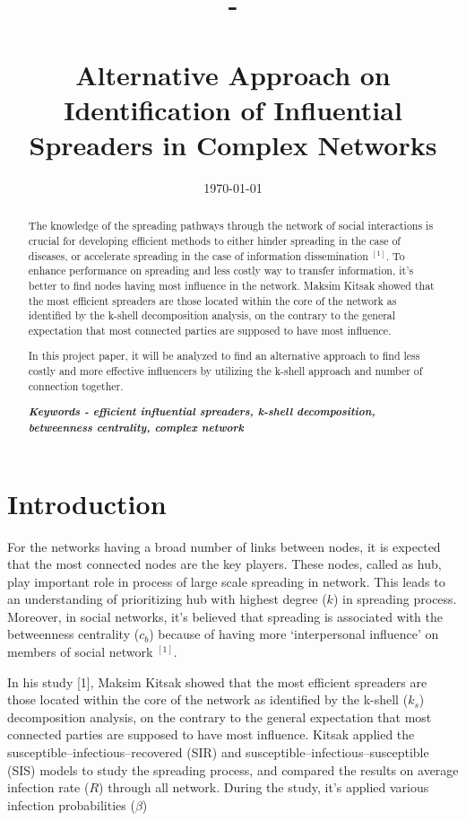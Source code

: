 \documentclass[11pt,a4,twocolumn]{article}
\title{
	{\small 	
		\hbCourse - 
		\hbSemester\\
	}
	\hbWhat\\
	Alternative Approach on Identification of Influential Spreaders in Complex Networks
}
\author{\hbYourName}
\date{\today}
\begin{document}
\maketitle

 \begin{abstract}

The knowledge of the spreading pathways through the network of social interactions is crucial for developing efficient methods to either hinder spreading in the case of diseases, or accelerate spreading in the case of information dissemination  $^{[1]}$. To enhance performance on spreading and less costly way to transfer information, it’s better to find nodes having most influence in the network.  Maksim Kitsak showed that the most efficient spreaders are those located within the core of the network as identified by the k-shell decomposition analysis, on the contrary to the general expectation that most connected parties are supposed to have most influence. 

In this project paper, it will be analyzed to find an alternative approach to find less costly and more effective influencers by utilizing the k-shell approach and number of connection together.

\textbf{\textit{Keywords -  efficient influential spreaders, k-shell decomposition, betweenness centrality, complex network}}

\end{abstract}




\section{Introduction} 

For the networks having a broad number of links between nodes, it is expected that the most connected nodes are the key players. These nodes, called as hub, play important role in process of large scale spreading in network. This leads to an understanding of prioritizing hub with highest degree ($k$) in spreading process. Moreover, in social networks, it's believed that spreading is associated with the betweenness centrality ($c_{b}$) because of having more ‘interpersonal
influence’ on members of social network $^{[1]}$.

In his study [1], Maksim Kitsak showed that the most efficient spreaders are those located within the core of the network as identified by the k-shell ($k_{s}$) decomposition analysis, on the contrary to the general expectation that most connected parties are supposed to have most influence. Kitsak applied the susceptible–infectious–recovered (SIR) and susceptible–infectious–susceptible (SIS) models to study the spreading process, and compared the results on average infection rate ($R$) through all network. During the study, it's applied various infection probabilities ($\beta$)
\end{document}

